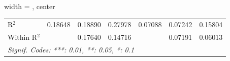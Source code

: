 \begin{table}[htbp]
\begin{adjustbox}{width = \textwidth, center}
\begin{tabular}{lcccccc}
         R$^2$                     & 0.18648                 & 0.18890                 & 0.27978                 & 0.07088                 & 0.07242                 & 0.15804\\  
         Within R$^2$              &                         & 0.17640                 & 0.14716                 &                         & 0.07191                 & 0.06013\\  
         \midrule \midrule
         \multicolumn{7}{l}{\emph{Signif. Codes: ***: 0.01, **: 0.05, *: 0.1}}\\
      \end{tabular}
   \end{adjustbox}
\end{table}


